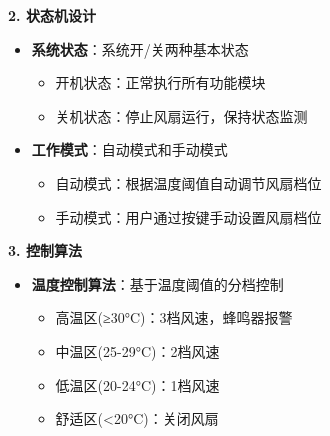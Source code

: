 \textbf{2. 状态机设计}
\begin{itemize}
    \vspace{-6pt}
  \item \textbf{系统状态}：系统开/关两种基本状态
    \begin{itemize}
        \vspace{-3pt}
      \item 开机状态：正常执行所有功能模块
        \vspace{-3pt}
      \item 关机状态：停止风扇运行，保持状态监测
    \end{itemize}
    \vspace{-6pt}
  \item \textbf{工作模式}：自动模式和手动模式
    \begin{itemize}
        \vspace{-3pt}
      \item 自动模式：根据温度阈值自动调节风扇档位
        \vspace{-3pt}
      \item 手动模式：用户通过按键手动设置风扇档位
    \end{itemize}
    \vspace{-6pt}
\end{itemize}

\textbf{3. 控制算法}
\begin{itemize}
    \vspace{-6pt}
  \item \textbf{温度控制算法}：基于温度阈值的分档控制
    \begin{itemize}
        \vspace{-3pt}
      \item 高温区(≥30°C)：3档风速，蜂鸣器报警
        \vspace{-3pt}
      \item 中温区(25-29°C)：2档风速
        \vspace{-3pt}
      \item 低温区(20-24°C)：1档风速
        \vspace{-3pt}
      \item 舒适区(<20°C)：关闭风扇
    \end{itemize}
    \vspace{-6pt}

\end{itemize}

